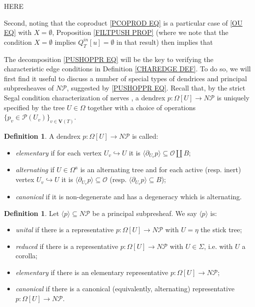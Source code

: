 \documentclass[a4paper,10pt
,draft
]{article}%
\numberwithin{equation}{section}
\numberwithin{figure}{section}
\theoremstyle{definition} %
\newtheorem{definition}[equation]{Definition}%
\renewcommand{\O}{\ensuremath{\mathcal O}}
\newcommand{\1}{\ensuremath{\mathbbm 1}}%
\begin{document}
{\color{red} HERE}


Second, noting that the coproduct \eqref{PCOPROD EQ}
is a particular case of \eqref{OU EQ} with $X=\emptyset$,
Proposition \ref{FILTPUSH PROP}
(where we note that the condition $X=\emptyset$ implies
$Q^{in}_T[u] = \emptyset$ in that result)
then implies that  




The decomposition \eqref{PUSHOPPR EQ}
will be the key to verifying the 
characteristic edge conditions in Definition \ref{CHAREDGE DEF}.
To do so, we will first find it useful to discuss a number of special types of dendrices and principal subpresheaves of $N \mathcal{P}$, suggested by \eqref{PUSHOPPR EQ}.
%
Recall that, by the strict Segal condition characterization of nerves \cite[Cor. 2.7]{CM13a},
a dendrex $p \colon \Omega[U] \to N \mathcal{P}$
is uniquely specified by the tree $U \in \Omega$ together with a choice of operations
$\{p_v \in \mathcal{P}(U_v)\}_{v \in \boldsymbol{V}(T)}$.


\begin{definition}
	A dendrex $p\colon \Omega[U] \to N \mathcal{P}$ 
	is called:
	\begin{itemize}
		\item \emph{elementary} if for each vertex $U_v \hookrightarrow U$
		it is $\langle \partial_{U_v} p\rangle \subseteq \mathcal{O} \amalg B$; %
		\item \emph{alternating} if $U \in \Omega^a$ is an alternating tree
		and for each active (resp. inert) vertex 
		$U_v \hookrightarrow U$ it is
		$\langle \partial_{U_v} p \rangle \subseteq \O$
		(resp. $\langle \partial_{U_v} p \rangle \subseteq B$);
		\item \emph{canonical} if it is non-degenerate and has a degeneracy which is alternating.
	\end{itemize}
\end{definition}


\begin{definition}
	Let $\langle p \rangle \subseteq N \mathcal{P}$ be 
	a principal subpresheaf. 
	We say $\langle p \rangle$ is:
	\begin{itemize}
		\item \emph{unital} if there is a representative
		$p\colon \Omega[U] \to N \mathcal{P}$ with $U=\eta$ the stick tree;
		\item \emph{reduced} if there is a representative
		$p\colon \Omega[U] \to N \mathcal{P}$ with $U \in \Sigma$, i.e. with $U$ a corolla;
		\item \emph{elementary} 
		if there is an elementary representative
		$p\colon \Omega[U] \to N \mathcal{P}$;
		\item \emph{canonical} 
		if there is a canonical (equivalently, alternating) representative
		$p\colon \Omega[U] \to N \mathcal{P}$.
	\end{itemize}
\end{definition}
\end{document}
